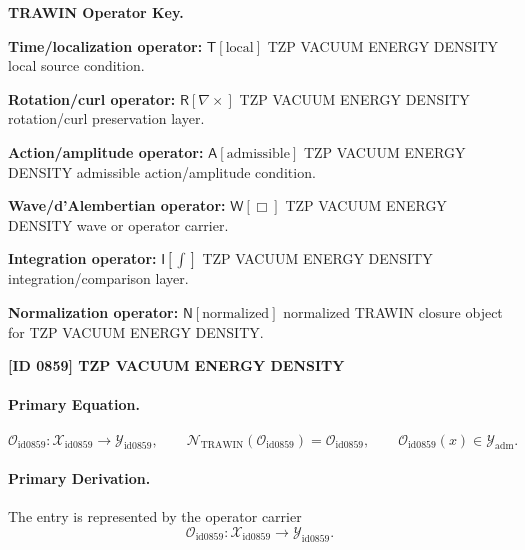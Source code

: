 \par\vspace{0.45\baselineskip}
\noindent\begin{minipage}[t]{\linewidth}
\begingroup
\small
\raggedright
\textbf{TRAWIN Operator Key.}\par
\noindent\textbf{Time/localization operator:} $\mathsf{T}\!\left[\mathrm{local}\right]$ TZP VACUUM ENERGY DENSITY local source condition.\par
\noindent\textbf{Rotation/curl operator:} $\mathsf{R}\!\left[\nabla\times\right]$ TZP VACUUM ENERGY DENSITY rotation/curl preservation layer.\par
\noindent\textbf{Action/amplitude operator:} $\mathsf{A}\!\left[\mathrm{admissible}\right]$ TZP VACUUM ENERGY DENSITY admissible action/amplitude condition.\par
\noindent\textbf{Wave/d'Alembertian operator:} $\mathsf{W}\!\left[\Box\right]$ TZP VACUUM ENERGY DENSITY wave or operator carrier.\par
\noindent\textbf{Integration operator:} $\mathsf{I}\!\left[\int\right]$ TZP VACUUM ENERGY DENSITY integration/comparison layer.\par
\noindent\textbf{Normalization operator:} $\mathsf{N}\!\left[\mathrm{normalized}\right]$ normalized TRAWIN closure object for TZP VACUUM ENERGY DENSITY.\par
\endgroup
\end{minipage}

\clearpage
\noindent\textbf{[ID 0859] TZP VACUUM ENERGY DENSITY}\par
\vspace{0.35em}
\paragraph{Primary Equation.}
\[
\mathcal{O}_{\mathrm{id0859}}:\mathcal{X}_{\mathrm{id0859}}\longrightarrow \mathcal{Y}_{\mathrm{id0859}},\qquad
\mathcal{N}_{\mathrm{TRAWIN}}(\mathcal{O}_{\mathrm{id0859}})=\mathcal{O}_{\mathrm{id0859}},\qquad
\mathcal{O}_{\mathrm{id0859}}(x)\in\mathcal{Y}_{\mathrm{adm}}.
\]

\paragraph{Primary Derivation.} The entry is represented by the operator carrier\[
\mathcal{O}_{\mathrm{id0859}}:\mathcal{X}_{\mathrm{id0859}}\longrightarrow \mathcal{Y}_{\mathrm{id0859}}.
\]

